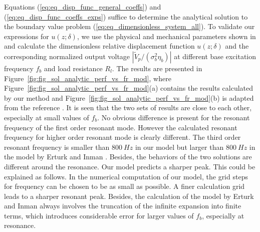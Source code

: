 \documentclass{svjour3}                     %
\begin{document}
Equations (\ref{eq:eq_disp_func_general_coeffs}) and (\ref{eq:eq_disp_func_coeffs_exps}) suffice to determine the analytical solution to the boundary value problem (\ref{eq:eq_dimensionless_system_all}). To validate our expressions for $u(z;\delta)$, we use the physical and mechanical parameters shown in \cite{erturk2008distributed} and calculate the dimensionless relative displacement function $u(z;\delta)$ and the corresponding normalized output voltage $| \tilde{V}_p/(\sigma_b^2 \eta_b) |$ at different base excitation frequency $f_b$ and load resistance $R_l$. The results are presented in Figure~\ref{fig:fig_sol_analytic_perf_vs_fr_mod}, where Figure~\ref{fig:fig_sol_analytic_perf_vs_fr_mod}(a) contains the results calculated by our method and Figure~\ref{fig:fig_sol_analytic_perf_vs_fr_mod}(b) is adapted from the reference \cite{erturk2008distributed}. It is seen that the two sets of results are close to each other, especially at small values of $f_b$. No obvious difference is present for the resonant frequency of the first order resonant mode. However the calculated resonant frequency for higher order resonant mode is clearly different. The third order resonant frequency is smaller than $800\ Hz$ in our model but larger than $800\ Hz$ in the model by Erturk and Inman \cite{erturk2008distributed}. Besides, the behaviors of the two solutions are different around the resonance. Our model predicts a sharper peak. This could be explained as follows. In the numerical computation of our model, the grid steps for frequency can be chosen to be as small as possible. A finer calculation grid leads to a sharper resonant peak. Besides, the calculation of the model by Erturk and Inman \cite{erturk2008distributed} always involves the truncation of the infinite expansion into finite terms, which introduces considerable error for larger values of $f_b$, especially at resonance. 
\end{document}
